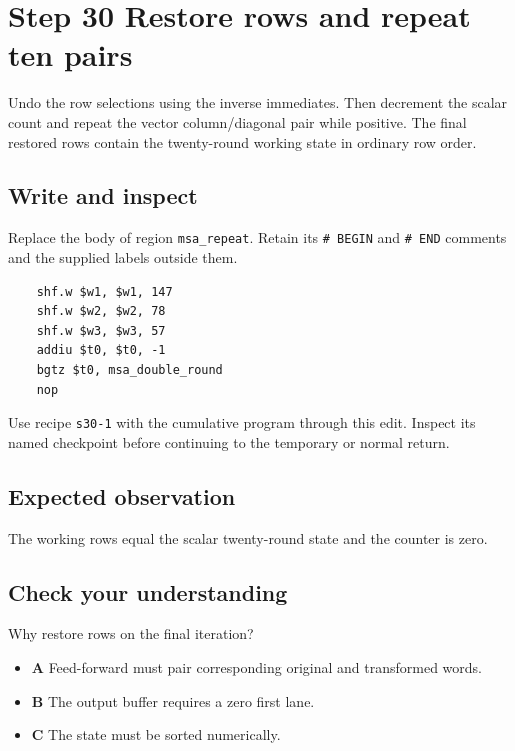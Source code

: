 \section{Step 30 Restore rows and repeat ten pairs}\label{chacha-s30}

Undo the row selections using the inverse immediates. Then decrement the scalar count and repeat the vector column/diagonal pair while positive. The final restored rows contain the twenty-round working state in ordinary row order.

\subsection{Write and inspect}
Replace the body of region \texttt{msa\_repeat}. Retain its \texttt{\# BEGIN} and \texttt{\# END} comments and the supplied labels outside them.

\begin{verbatim}
    shf.w $w1, $w1, 147
    shf.w $w2, $w2, 78
    shf.w $w3, $w3, 57
    addiu $t0, $t0, -1
    bgtz $t0, msa_double_round
    nop
\end{verbatim}

Use recipe \texttt{s30-1} with the cumulative program through this edit. Inspect its named checkpoint before continuing to the temporary or normal return.

\subsection{Expected observation}
The working rows equal the scalar twenty-round state and the counter is zero.

\subsection{Check your understanding}
Why restore rows on the final iteration?

\begin{itemize}
  \item \textbf{A} Feed-forward must pair corresponding original and transformed words.
  \item \textbf{B} The output buffer requires a zero first lane.
  \item \textbf{C} The state must be sorted numerically.
\end{itemize}

